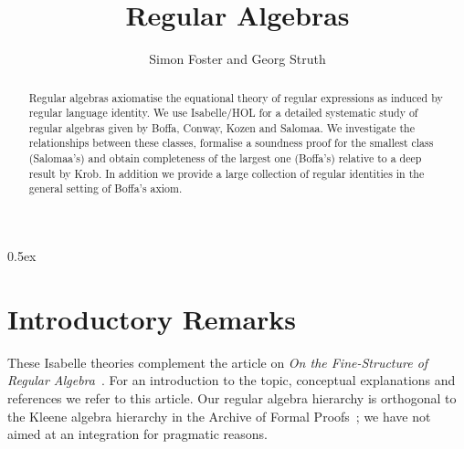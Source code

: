 \documentclass[11pt,a4paper]{article}
\begin{document}
\title{Regular Algebras}
\author{Simon Foster and Georg Struth}
\maketitle

\begin{abstract}
  Regular algebras axiomatise the equational theory of regular 
  expressions as induced by regular language identity.  We use 
  Isabelle/HOL for a detailed systematic study of regular algebras 
  given by Boffa, Conway, Kozen and Salomaa. We investigate the 
  relationships between these classes, formalise a soundness proof for 
  the smallest class (Salomaa's) and obtain completeness of the 
  largest one (Boffa's) relative to a deep result by Krob. In 
  addition we provide a large collection of regular identities 
  in the general setting of Boffa's axiom. 
\end{abstract}

\tableofcontents

\parindent 0pt\parskip 0.5ex

\section{Introductory Remarks}

These Isabelle theories complement the article on \emph{On the
  Fine-Structure of Regular Algebra}~\cite{FosterS15}.  For an
introduction to the topic, conceptual explanations and references we
refer to this article. Our regular algebra hierarchy is orthogonal to
the Kleene algebra hierarchy in the Archive of Formal
Proofs~\cite{ArmstrongStruthWeberArchive}; we have not aimed at an
integration for pragmatic reasons.





\end{document}
